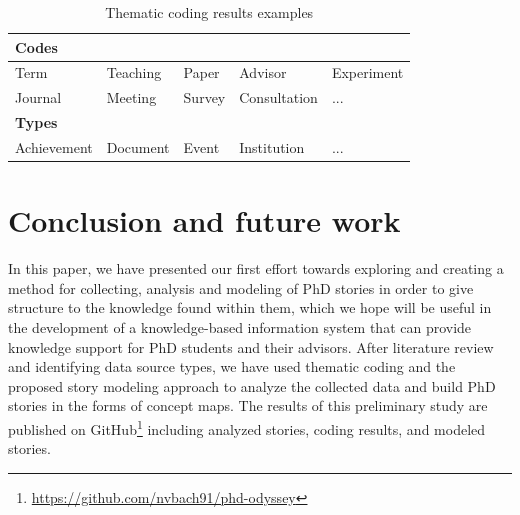 \documentclass[sigconf]{acmart}
\begin{document}
\begin{table}[ht]
\small
\caption[coding results]{Thematic coding results examples\footnotemark}
\label{table:thematic-coding}
\begin{tabular}{|l|l|l|l|l|}
\hline
\multicolumn{5}{|l|}{\textbf{Codes}}                                                   \\ \hline
Term              & Teaching               & Paper        & Advisor       & Experiment \\ \hline
Journal           & Meeting                & Survey       & Consultation  & ...        \\ \hline
\hline
\multicolumn{5}{|l|}{\textbf{Types}}                                                   \\ \hline
Achievement       & Document               & Event        & Institution   & ...        \\ \hline
\end{tabular}
\end{table}





\section{Conclusion and future work}
In this paper, we have presented our first effort towards exploring and creating a method for collecting, analysis and modeling of PhD stories in order to give structure to the knowledge found within them, which we hope will be useful in the development of a knowledge-based information system that can provide knowledge support for PhD students and their advisors. After literature review and identifying data source types, we have used thematic coding and the proposed story modeling approach to analyze the collected data and build PhD stories in the forms of concept maps. The results of this preliminary study are published on GitHub\footnote{\url{https://github.com/nvbach91/phd-odyssey}} including analyzed stories, coding results, and modeled stories.
\end{document}
